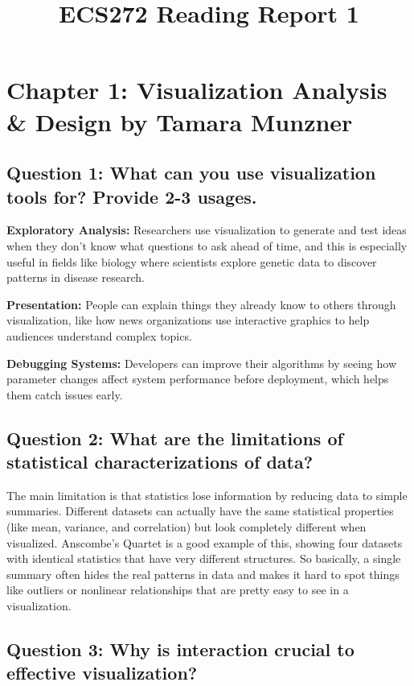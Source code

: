 \documentclass[11pt]{article}
\title{ECS272 Reading Report 1}
\author{}
\date{}
\begin{document}
\maketitle

\section*{Chapter 1: Visualization Analysis \& Design by Tamara Munzner}

\subsection*{Question 1: What can you use visualization tools for? Provide 2-3 usages.}

\textbf{Exploratory Analysis:} Researchers use visualization to generate and test ideas when they don't know what questions to ask ahead of time, and this is especially useful in fields like biology where scientists explore genetic data to discover patterns in disease research.

\textbf{Presentation:} People can explain things they already know to others through visualization, like how news organizations use interactive graphics to help audiences understand complex topics.

\textbf{Debugging Systems:} Developers can improve their algorithms by seeing how parameter changes affect system performance before deployment, which helps them catch issues early.

\subsection*{Question 2: What are the limitations of statistical characterizations of data?}

The main limitation is that statistics lose information by reducing data to simple summaries. Different datasets can actually have the same statistical properties (like mean, variance, and correlation) but look completely different when visualized. Anscombe's Quartet is a good example of this, showing four datasets with identical statistics that have very different structures. So basically, a single summary often hides the real patterns in data and makes it hard to spot things like outliers or nonlinear relationships that are pretty easy to see in a visualization.

\subsection*{Question 3: Why is interaction crucial to effective visualization?}
\end{document}
